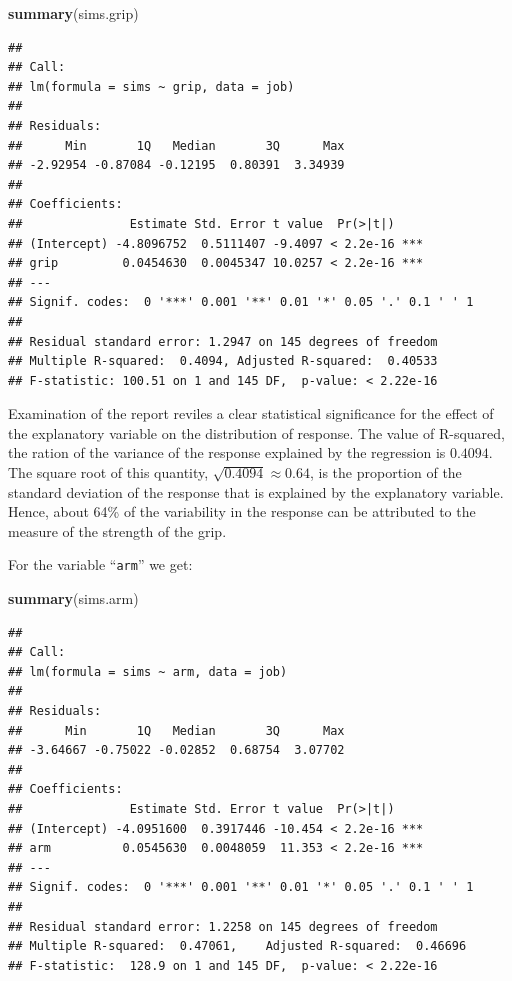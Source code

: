 \documentclass[]{krantz}
\makeatletter
\newenvironment{Shaded}{\begin{snugshade}}{\end{snugshade}}
\newcommand{\KeywordTok}[1]{\textcolor[rgb]{0.13,0.29,0.53}{\textbf{#1}}}
\newcommand{\NormalTok}[1]{#1}
\newenvironment{kframe}{%
\medskip{}
\setlength{\fboxsep}{.8em}
 \def\at@end@of@kframe{}%
 \ifinner\ifhmode%
  \def\at@end@of@kframe{\end{minipage}}%
  \begin{minipage}{\columnwidth}%
 \fi\fi%
 \def\FrameCommand##1{\hskip\@totalleftmargin \hskip-\fboxsep
 \colorbox{shadecolor}{##1}\hskip-\fboxsep
     \hskip-\linewidth \hskip-\@totalleftmargin \hskip\columnwidth}%
 \MakeFramed {\advance\hsize-\width
   \@totalleftmargin\z@ \linewidth\hsize
   \@setminipage}}%
 {\par\unskip\endMakeFramed%
 \at@end@of@kframe}
\renewenvironment{Shaded}{\begin{kframe}}{\end{kframe}}
\theoremstyle{definition}
\theoremstyle{definition}
\theoremstyle{definition}
\theoremstyle{remark}
\makeatother
\begin{document}
\begin{Shaded}
\begin{Highlighting}[]
\KeywordTok{summary}\NormalTok{(sims.grip)}
\end{Highlighting}
\end{Shaded}

\begin{verbatim}
## 
## Call:
## lm(formula = sims ~ grip, data = job)
## 
## Residuals:
##      Min       1Q   Median       3Q      Max 
## -2.92954 -0.87084 -0.12195  0.80391  3.34939 
## 
## Coefficients:
##               Estimate Std. Error t value  Pr(>|t|)    
## (Intercept) -4.8096752  0.5111407 -9.4097 < 2.2e-16 ***
## grip         0.0454630  0.0045347 10.0257 < 2.2e-16 ***
## ---
## Signif. codes:  0 '***' 0.001 '**' 0.01 '*' 0.05 '.' 0.1 ' ' 1
## 
## Residual standard error: 1.2947 on 145 degrees of freedom
## Multiple R-squared:  0.4094, Adjusted R-squared:  0.40533 
## F-statistic: 100.51 on 1 and 145 DF,  p-value: < 2.22e-16
\end{verbatim}

Examination of the report reviles a clear statistical significance for
the effect of the explanatory variable on the distribution of response.
The value of R-squared, the ration of the variance of the response
explained by the regression is \(0.4094\). The square root of this
quantity, \(\sqrt{0.4094} \approx 0.64\), is the proportion of the
standard deviation of the response that is explained by the explanatory
variable. Hence, about 64\% of the variability in the response can be
attributed to the measure of the strength of the grip.

For the variable ``\texttt{arm}'' we get:

\begin{Shaded}
\begin{Highlighting}[]
\KeywordTok{summary}\NormalTok{(sims.arm)}
\end{Highlighting}
\end{Shaded}

\begin{verbatim}
## 
## Call:
## lm(formula = sims ~ arm, data = job)
## 
## Residuals:
##      Min       1Q   Median       3Q      Max 
## -3.64667 -0.75022 -0.02852  0.68754  3.07702 
## 
## Coefficients:
##               Estimate Std. Error t value  Pr(>|t|)    
## (Intercept) -4.0951600  0.3917446 -10.454 < 2.2e-16 ***
## arm          0.0545630  0.0048059  11.353 < 2.2e-16 ***
## ---
## Signif. codes:  0 '***' 0.001 '**' 0.01 '*' 0.05 '.' 0.1 ' ' 1
## 
## Residual standard error: 1.2258 on 145 degrees of freedom
## Multiple R-squared:  0.47061,    Adjusted R-squared:  0.46696 
## F-statistic:  128.9 on 1 and 145 DF,  p-value: < 2.22e-16
\end{verbatim}
\end{document}
